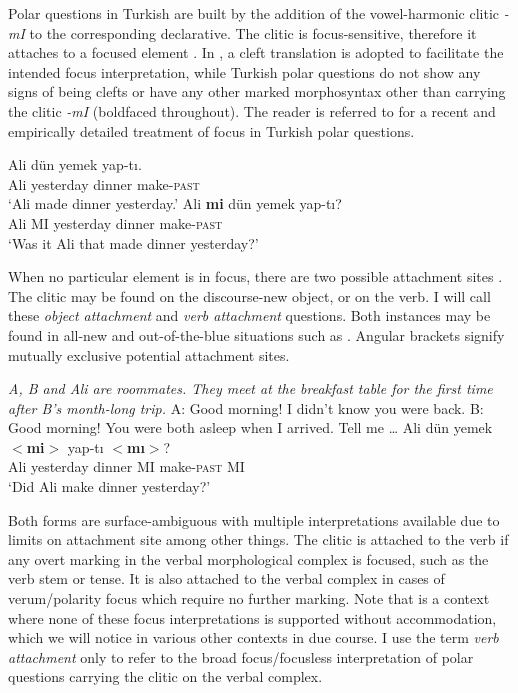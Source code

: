\documentclass[output=paper,colorlinks,citecolor=brown]{langscibook}
\begin{document}
Polar questions in Turkish are built by the addition of the vowel-harmonic clitic \textit{-mI} to the corresponding declarative. The clitic is focus-sensitive, therefore it attaches to a focused element \citep{Ladd:1996, kornfilt}.  In , a cleft translation is adopted to facilitate the intended focus interpretation, while Turkish polar questions do not show any signs of being clefts or have any other marked morphosyntax other than carrying the clitic \textit{-mI} (boldfaced throughout). The reader is referred to \citet{kamali-krifka} for a recent and empirically detailed treatment of focus in Turkish polar questions.

\ea\label{ex:11:4}
\ea\label{ex:11:4a}
\gll Ali dün yemek yap-tı.\\
Ali yesterday dinner make-\textsc{past}\\
\glt `Ali made dinner yesterday.'
\ex\label{ex:11:4b}
\gll Ali \textbf{mi} dün yemek yap-tı? \\
Ali MI yesterday dinner make-\textsc{past}\\
\glt `Was it Ali that made dinner yesterday?'
\z
\z
	
When no particular element is in focus, there are two possible attachment sites \citep{kamali-wccfl, kamali-diss}. The clitic may be found on the discourse-new object, or on the verb. I will call these \textit{object attachment} and \textit{verb attachment} questions. Both instances may be found in all-new and out-of-the-blue situations such as . Angular brackets signify mutually exclusive potential attachment sites.

\ea \label{ex:11:5} \textit{A, B and Ali are roommates. They meet at the breakfast table for the first time after B's month-long trip.}
\sn A: Good morning! I didn't know you were back.
\sn B: Good morning! You were both asleep when I arrived. Tell me \ldots
\sn \gll Ali dün yemek \textbf{$<$mi$>$} yap-tı{} \textbf{$<$mı$>$}?\\
Ali yesterday dinner \phantom{$<$}MI make-\textsc{past} \phantom{$<$}MI\\
\glt `Did Ali make dinner yesterday?'
\z

Both forms are surface-ambiguous with multiple interpretations available due to limits on attachment site among other things. The clitic is attached to the verb if any overt marking in the verbal morphological complex is focused, such as the verb stem or tense. It is also attached to the verbal complex in cases of verum/polarity focus which require no further marking. Note that  is a context where none of these focus interpretations is supported without accommodation, which we will notice in various other contexts in due course. I use the term \textit{verb attachment} only to refer to the broad focus/focusless interpretation of polar questions carrying the clitic on the verbal complex.
\end{document}
